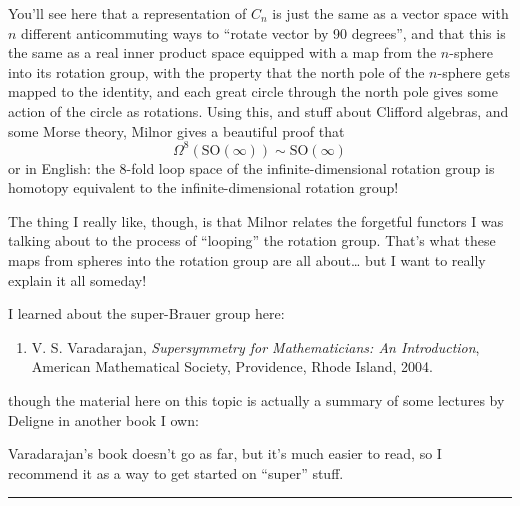 \documentclass{article}
\def\tightlist{}
\renewcommand{\texttt}[1]{%
  \begingroup
  \ttfamily
  \begingroup\lccode`~=`/\lowercase{\endgroup\def~}{/\discretionary{}{}{}}%
  \begingroup\lccode`~=`[\lowercase{\endgroup\def~}{[\discretionary{}{}{}}%
  \begingroup\lccode`~=`.\lowercase{\endgroup\def~}{.\discretionary{}{}{}}%
  \catcode`/=\active\catcode`[=\active\catcode`.=\active
  \scantokens{#1\noexpand}%
  \endgroup
}
\begin{document}
You'll see here that a representation of \(C_n\) is just the same as a
vector space with \(n\) different anticommuting ways to ``rotate vector
by 90 degrees'', and that this is the same as a real inner product space
equipped with a map from the \(n\)-sphere into its rotation group, with
the property that the north pole of the \(n\)-sphere gets mapped to the
identity, and each great circle through the north pole gives some action
of the circle as rotations. Using this, and stuff about Clifford
algebras, and some Morse theory, Milnor gives a beautiful proof that
\[\Omega^8(\mathrm{SO}(\infty)) \sim \mathrm{SO}(\infty)\] or in
English: the 8-fold loop space of the infinite-dimensional rotation
group is homotopy equivalent to the infinite-dimensional rotation group!

The thing I really like, though, is that Milnor relates the forgetful
functors I was talking about to the process of ``looping'' the rotation
group. That's what these maps from spheres into the rotation group are
all about\ldots{} but I want to really explain it all someday!

I learned about the super-Brauer group here:

\begin{enumerate}
\def\labelenumi{\arabic{enumi})}
\setcounter{enumi}{4}
\tightlist
\item
  V. S. Varadarajan, \emph{Supersymmetry for Mathematicians: An
  Introduction}, American Mathematical Society, Providence, Rhode
  Island, 2004.
\end{enumerate}

though the material here on this topic is actually a summary of some
lectures by Deligne in another book I own:


Varadarajan's book doesn't go as far, but it's much easier to read, so I
recommend it as a way to get started on ``super'' stuff.

\begin{center}\rule{0.5\linewidth}{0.5pt}\end{center}
\end{document}
